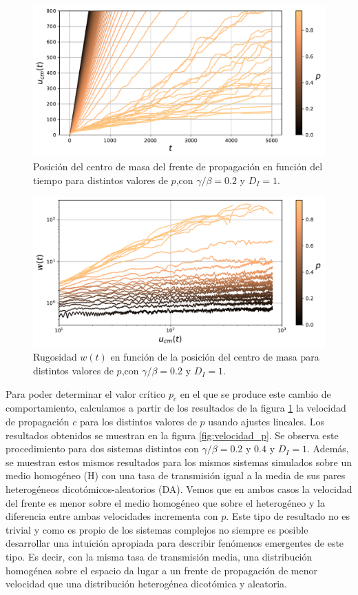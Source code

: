 \begin{figure}[H]
    \centering
    \includegraphics[width=\imsizeL]{u_cm(t)_hetal.pdf}
    \caption{Posición del centro de masa del frente de propagación en función del tiempo para distintos valores de $p$,con $\gamma/\beta=0.2$ y $D_{I}=1$.}
    \label{fig:u_cm(t)_hetal}
\end{figure}
\begin{figure}[H]
    \centering
    \includegraphics[width=\imsizeL]{rugosidad.pdf}
    \caption{Rugosidad $w(t)$ en función de la posición del centro de masa para distintos valores de $p$,con $\gamma/\beta=0.2$ y $D_{I}=1$.}
    \label{fig:rugosidad}
\end{figure}

Para poder determinar el valor crítico $p_c$ en el que se produce este cambio de comportamiento, calculamos a partir de los resultados de la figura \ref{fig:u_cm(t)_hetal}
la velocidad de propagación $c$ para los distintos valores de $p$ usando ajustes lineales. Los resultados obtenidos se muestran en la figura \ref{fig:velocidad_p}.
Se observa este procedimiento para dos sistemas distintos con $\gamma/\beta=0.2$ y $0.4$ y $D_{I}=1$. Además, se muestran estos mismos resultados para los mismos 
sistemas simulados sobre un medio homogéneo (H) con una tasa de transmisión igual a la media de sus pares heterogéneos dicotómicos-aleatorios (DA). Vemos que en ambos casos la velocidad 
del frente es menor sobre el medio homogéneo que sobre el heterogéneo y la diferencia entre ambas velocidades incrementa con $p$. Este tipo de resultado no es 
trivial y como es propio de los sistemas complejos no siempre es posible desarrollar una intuición apropiada para describir fenómenos emergentes de este tipo.
Es decir, con la misma tasa de transmisión media, una distribución homogénea sobre el espacio da lugar a un frente de propagación de menor velocidad 
que una distribución heterogénea dicotómica y aleatoria. 

